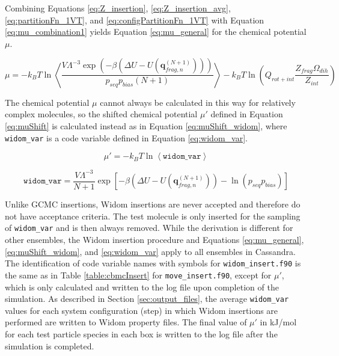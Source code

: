 Combining Equations \ref{eq:Z_insertion}, \ref{eq:Z_insertion_avg}, \ref{eq:partitionFn_1VT}, and \ref{eq:configPartitionFn_1VT} with Equation \ref{eq:mu_combination1} yields Equation \ref{eq:mu_general} for the chemical potential $\mu$.

\begin{equation}
    \label{eq:mu_general}
    \mu = -k_B T \ln{\left\langle \frac{V\Lambda^{-3}  \exp{(-\beta({\Delta}U-U (\mathbf{q}_{frag,n}^{(N+1)} )))}}{p_{seq} p_{bias} (N+1)} \right\rangle}
    - k_B T \ln\left( Q_{rot+int} \frac{Z_{frag}\Omega_{dih}}{Z_{int}} \right)
\end{equation}

The chemical potential $\mu$ cannot always be calculated in this way for relatively complex molecules, so the shifted chemical potential $\mu'$ defined in Equation \ref{eq:muShift} is calculated instead as in Equation \ref{eq:muShift_widom}, where \texttt{widom\_var} is a code variable defined in Equation \ref{eq:widom_var}.

\begin{equation}
    \label{eq:muShift_widom}
    \mu' = -k_B T \ln{\left\langle \texttt{widom\_var} \right\rangle}
\end{equation}


\begin{equation}
\label{eq:widom_var}
    \texttt{widom\_var} = \frac{V\Lambda^{-3}}{N+1} \exp{\left[-\beta({\Delta}U-U (\mathbf{q}_{frag,n}^{(N+1)} )) - \ln{(p_{seq} p_{bias})}\right]} 
\end{equation}

Unlike GCMC insertions, Widom insertions are never accepted and therefore do not have acceptance criteria.  The test molecule is only inserted for the sampling of \texttt{widom\_var} and is then always removed. While the derivation is different for other ensembles, the Widom insertion procedure and Equations \ref{eq:mu_general}, \ref{eq:muShift_widom}, and \ref{eq:widom_var} apply to all ensembles in Cassandra.  The identification of code variable names with symbols for \texttt{widom\_insert.f90} is the same as in Table \ref{table:cbmcInsert} for \texttt{move\_insert.f90}, except for $\mu'$, which is only calculated and written to the log file upon completion of the simulation.  As described in Section \ref{sec:output_files}, the average  \texttt{widom\_var} values for each system configuration (step) in which Widom insertions are performed are written to Widom property files.  The final value of $\mu'$ in kJ/mol for each test particle species in each box is written to the log file after the simulation is completed.
